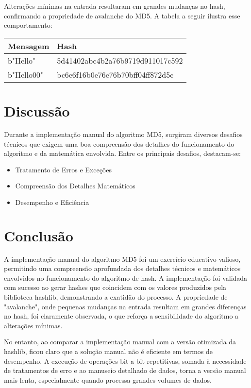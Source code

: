 \documentclass{article}
\begin{document}
Alterações mínimas na entrada resultaram em grandes mudanças no hash, confirmando a propriedade de avalanche do MD5. A tabela a seguir ilustra esse comportamento:

\begin{longtable}{|l|l|}
\hline
\textbf{Mensagem} & \textbf{Hash} \\
\hline
\endfirsthead
\hline
b"Hello" & 5d41402abc4b2a76b9719d911017c592 \\
\hline
b"Hello00" & bc6e6f16b0e76e76b70bff04ff872d5c \\
\hline
\end{longtable}

\section*{Discussão}

Durante a implementação manual do algoritmo MD5, surgiram diversos desafios técnicos que exigem uma boa compreensão dos detalhes do funcionamento do algoritmo e da matemática envolvida. Entre os principais desafios, destacam-se:

\begin{itemize}
    \item Tratamento de Erros e Exceções
    \item Compreensão dos Detalhes Matemáticos
    \item Desempenho e Eficiência
\end{itemize}

\section*{Conclusão}

A implementação manual do algoritmo MD5 foi um exercício educativo valioso, permitindo uma compreensão aprofundada dos detalhes técnicos e matemáticos envolvidos no funcionamento do algoritmo de hash. A implementação foi validada com sucesso ao gerar hashes que coincidem com os valores produzidos pela biblioteca hashlib, demonstrando a exatidão do processo. A propriedade de "avalanche", onde pequenas mudanças na entrada resultam em grandes diferenças no hash, foi claramente observada, o que reforça a sensibilidade do algoritmo a alterações mínimas.

No entanto, ao comparar a implementação manual com a versão otimizada da hashlib, ficou claro que a solução manual não é eficiente em termos de desempenho. A execução de operações bit a bit repetitivas, somada à necessidade de tratamentos de erro e ao manuseio detalhado de dados, torna a versão manual mais lenta, especialmente quando processa grandes volumes de dados.
\end{document}
